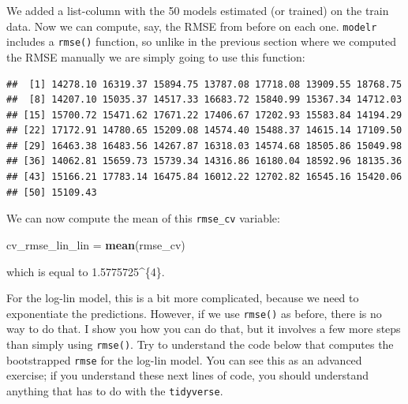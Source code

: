 \documentclass[]{gitbook}
\newenvironment{Shaded}{\begin{snugshade}}{\end{snugshade}}
\newcommand{\DataTypeTok}[1]{\textcolor[rgb]{0.13,0.29,0.53}{#1}}
\newcommand{\KeywordTok}[1]{\textcolor[rgb]{0.13,0.29,0.53}{\textbf{#1}}}
\newcommand{\NormalTok}[1]{#1}
\newcommand{\OperatorTok}[1]{\textcolor[rgb]{0.81,0.36,0.00}{\textbf{#1}}}
\newcommand{\StringTok}[1]{\textcolor[rgb]{0.31,0.60,0.02}{#1}}
\theoremstyle{definition}
\theoremstyle{definition}
\theoremstyle{definition}
\theoremstyle{remark}
\begin{document}
We added a list-column with the 50 models estimated (or trained) on the
train data. Now we can compute, say, the RMSE from before on each one.
\texttt{modelr} includes a \texttt{rmse()} function, so unlike in the
previous section where we computed the RMSE manually we are simply going
to use this function:

\begin{Shaded}
\end{Shaded}

\begin{verbatim}
##  [1] 14278.10 16319.37 15894.75 13787.08 17718.08 13909.55 18768.75
##  [8] 14207.10 15035.37 14517.33 16683.72 15840.99 15367.34 14712.03
## [15] 15700.72 15471.62 17671.22 17406.67 17202.93 15583.84 14194.29
## [22] 17172.91 14780.65 15209.08 14574.40 15488.37 14615.14 17109.50
## [29] 16463.38 16483.56 14267.87 16318.03 14574.68 18505.86 15049.98
## [36] 14062.81 15659.73 15739.34 14316.86 16180.04 18592.96 18135.36
## [43] 15166.21 17783.14 16475.84 16012.22 12702.82 16545.16 15420.06
## [50] 15109.43
\end{verbatim}

We can now compute the mean of this \texttt{rmse\_cv} variable:

\begin{Shaded}
\begin{Highlighting}[]
\NormalTok{cv_rmse_lin_lin =}\StringTok{ }\KeywordTok{mean}\NormalTok{(rmse_cv)}
\end{Highlighting}
\end{Shaded}

which is equal to 1.5775725\^{}\{4\}.

For the log-lin model, this is a bit more complicated, because we need
to exponentiate the predictions. However, if we use \texttt{rmse()} as
before, there is no way to do that. I show you how you can do that, but
it involves a few more steps than simply using \texttt{rmse()}. Try to
understand the code below that computes the bootstrapped \texttt{rmse}
for the log-lin model. You can see this as an advanced exercise; if you
understand these next lines of code, you should understand anything that
has to do with the \texttt{tidyverse}.
\end{document}
